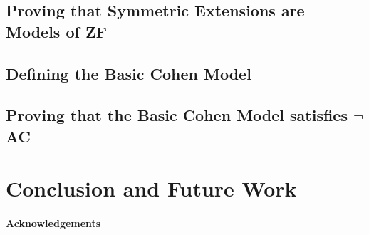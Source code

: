 \documentclass{report}
\begin{document}
\section{Proving that Symmetric Extensions are Models of ZF}
\begin{comment}
\subsection{Relativized Forcing Relation $\Vdash_{\text{HS}}$}
\subsection{The Symmetric Lemma}
\subsection{Separation}
\subsection{Replacement}
\subsection{Other Axioms}
\end{comment}

\section{Defining the Basic Cohen Model}
\begin{comment}
\subsection{The Notion of Forcing}
\subsection{The Group of Automorphisms}
\subsection{The Normal Filter}
\end{comment}

\section{Proving that the Basic Cohen Model satisfies $\neg$AC}

\chapter{Conclusion and Future Work}


  
\subsubsection{Acknowledgements}

\printbibliography
\end{document}
